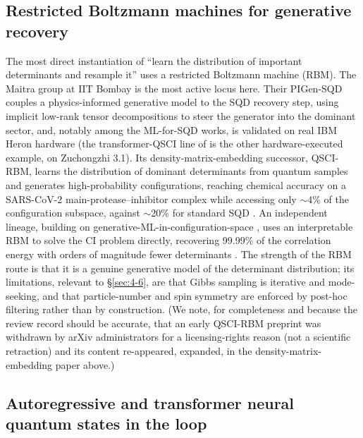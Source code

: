 \documentclass[11pt]{article}
\begin{document}
\subsection{Restricted Boltzmann machines for generative recovery}\label{sec:4-2}

The most direct instantiation of ``learn the distribution of important determinants and resample it'' uses a restricted Boltzmann machine (RBM). The Maitra group at IIT Bombay is the most active locus here. Their PIGen-SQD couples a physics-informed generative model to the SQD recovery step, using implicit low-rank tensor decompositions to steer the generator into the dominant sector, and, notably among the ML-for-SQD works, is validated on real IBM Heron hardware \cite{patra2025} (the transformer-QSCI line of \cite{zeng2026} is the other hardware-executed example, on Zuchongzhi 3.1). Its density-matrix-embedding successor, QSCI-RBM, learns the distribution of dominant determinants from quantum samples and generates high-probability configurations, reaching chemical accuracy on a SARS-CoV-2 main-protease--inhibitor complex while accessing only $\sim$4\% of the configuration subspace, against $\sim$20\% for standard SQD \cite{patra2026}. An independent lineage, building on generative-ML-in-configuration-space \cite{herzog2022}, uses an interpretable RBM to solve the CI problem directly, recovering 99.99\% of the correlation energy with orders of magnitude fewer determinants \cite{hernandezmartinez2025}. The strength of the RBM route is that it is a genuine generative model of the determinant distribution; its limitations, relevant to \S\ref{sec:4-6}, are that Gibbs sampling is iterative and mode-seeking, and that particle-number and spin symmetry are enforced by post-hoc filtering rather than by construction. (We note, for completeness and because the review record should be accurate, that an early QSCI-RBM preprint was withdrawn by arXiv administrators for a licensing-rights reason (not a scientific retraction) and its content re-appeared, expanded, in the density-matrix-embedding paper above.)


\subsection{Autoregressive and transformer neural quantum states in the loop}\label{sec:4-3}
\end{document}
